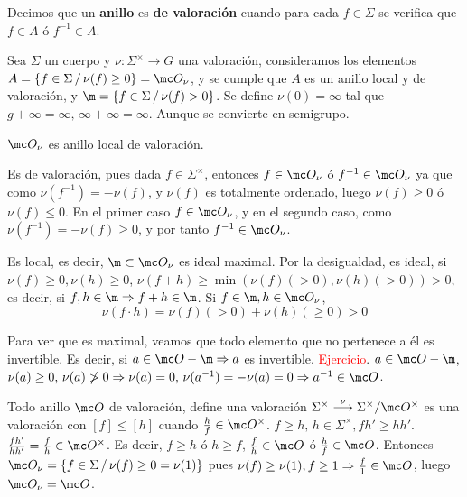 \begin{defi}
    Decimos que un \textbf{anillo} es \textbf{de valoraci\'on} cuando para cada $f \in \Sigma$ se verifica que $f\in A$ \'o $f^{-1} \in A$. 
\end{defi}
\begin{ejem}
    Sea $\Sigma$ un cuerpo y $\nu: \Sigma^{\times} \longrightarrow G$ una valoraci\'on, consideramos los elementos $A = \{ f \in \Sigma \,/\, \nu(f) \ge 0\}=\mc O_{\nu}$, y se cumple que $A$ es un anillo local y de valoraci\'on, y $\m = \{f\in \Sigma \, / \, \nu(f) > 0\}$. Se define $\nu(0)=\infty$ tal que $g+ \infty = \infty, \, \infty  + \infty = \infty$. Aunque se convierte en semigrupo.
\end{ejem}
\begin{teo}
    $\mc O_{\nu}$ es anillo local de valoraci\'on.
\end{teo}
\begin{dem}
    Es de valoraci\'on, pues dada $f\in \Sigma^{\times}$, entonces $f\in \mc O_{\nu}$ \'o $f^{-1}\in \mc O_{\nu}$ ya que como $\nu(f^{-1}) = -\nu(f)$, y $\nu(f)$ es totalmente ordenado, luego $\nu(f) \ge 0$ \'o $\nu(f) \le 0$. En el primer caso $f\in \mc O_{\nu}$, y en el segundo caso, como $\nu(f^{-1}) = - \nu(f) \ge 0$, y por tanto $f^{-1} \in \mc O_{\nu}$.

    Es local, es decir, $\m \subset\mc O_{\nu}$ es ideal maximal. Por la desigualdad, es ideal, si $\nu(f) \ge 0, \nu(h) \ge 0$, $\nu(f+h) \ge \min(\nu(f)(>0) , \nu(h)(>0) ) > 0 $, es decir, si $f, h\in \m \Rightarrow f+h \in \m$. Si $f\in \m, h \in \mc O_{\nu}$, 
    $$\nu(f\cdot h) = \nu(f) (>0) + \nu(h)(\ge 0) > 0 $$
    
    Para ver que es maximal, veamos que todo elemento que no pertenece a \'el es invertible. Es decir, si $a\in \mc O - \m\Rightarrow a $ es invertible. \textcolor{red}{Ejercicio}. $a\in \mc O - \m$, $\nu(a) \ge 0, \, \nu(a) \not> 0 \Rightarrow \nu(a)=0, \, \nu(a^{-1}) = -\nu(a) = 0 \Rightarrow a^{-1} \in \mc O$. 
\end{dem}

Todo anillo $\mc O$ de valoraci\'on, define una valoraci\'on $\Sigma^{\times} \overset{\nu}{\longrightarrow} \Sigma^{\times} / \mc O^{\times}$ es una valoraci\'on con $[f] \le [h]$ cuando $\frac{h}{f} \in \mc O^{\times}$. $f\ge h, \, h\in \Sigma^{\times}, fh'\ge hh'$. $\frac{fh'}{hh'} = \frac{f}{h} \in \mc O^{\times}$. Es decir, $f \ge h$ \'o $h\ge f$, $\frac{f}{h} \in \mc O$ \'o $\frac{h}{f}\in \mc O$. Entonces $\mc O_{\nu} = \{f\in \Sigma\, / \, \nu(f) \ge 0 = \nu(1)\}$ pues $\nu(f) \ge \nu(1), f\ge 1 \Rightarrow \frac{f}{1} \in \mc O$, luego $\mc O_{\nu} = \mc O$.

